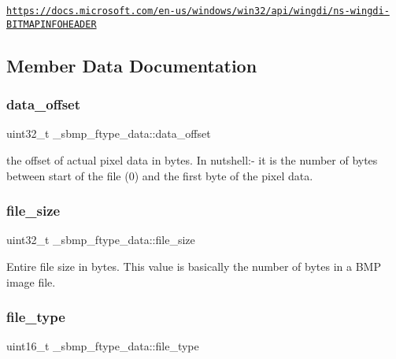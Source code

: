 \href{https://docs.microsoft.com/en-us/windows/win32/api/wingdi/ns-wingdi-BITMAPINFOHEADER}{\tt https\+://docs.\+microsoft.\+com/en-\/us/windows/win32/api/wingdi/ns-\/wingdi-\/\+B\+I\+T\+M\+A\+P\+I\+N\+F\+O\+H\+E\+A\+D\+ER} 

\subsection{Member Data Documentation}
\mbox{\label{struct__sbmp__ftype__data_ae9ac805e628ee68aa81431272b5227ed}} 
\subsubsection{\texorpdfstring{data\+\_\+offset}{data\_offset}}
{\footnotesize\ttfamily uint32\+\_\+t \+\_\+sbmp\+\_\+ftype\+\_\+data\+::data\+\_\+offset}

the offset of actual pixel data in bytes. In nutshell\+:-\/ it is the number of bytes between start of the file (0) and the first byte of the pixel data. \mbox{\label{struct__sbmp__ftype__data_aad71d549f130552f1fedac4343113040}} 
\subsubsection{\texorpdfstring{file\+\_\+size}{file\_size}}
{\footnotesize\ttfamily uint32\+\_\+t \+\_\+sbmp\+\_\+ftype\+\_\+data\+::file\+\_\+size}



Entire file size in bytes. This value is basically the number of bytes in a B\+MP image file. 

\mbox{\label{struct__sbmp__ftype__data_a3ba110f10c409b5759de6b41e5bb22be}} 
\subsubsection{\texorpdfstring{file\+\_\+type}{file\_type}}
{\footnotesize\ttfamily uint16\+\_\+t \+\_\+sbmp\+\_\+ftype\+\_\+data\+::file\+\_\+type}

